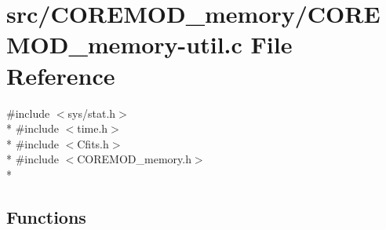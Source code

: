 \hypertarget{COREMOD__memory-util_8c}{\section{src/\+C\+O\+R\+E\+M\+O\+D\+\_\+memory/\+C\+O\+R\+E\+M\+O\+D\+\_\+memory-\/util.c File Reference}
\label{COREMOD__memory-util_8c}
}
{\ttfamily \#include $<$sys/stat.\+h$>$}\\*
{\ttfamily \#include $<$time.\+h$>$}\\*
{\ttfamily \#include $<$Cfits.\+h$>$}\\*
{\ttfamily \#include $<$C\+O\+R\+E\+M\+O\+D\+\_\+memory.\+h$>$}\\*
\subsection*{Functions}
